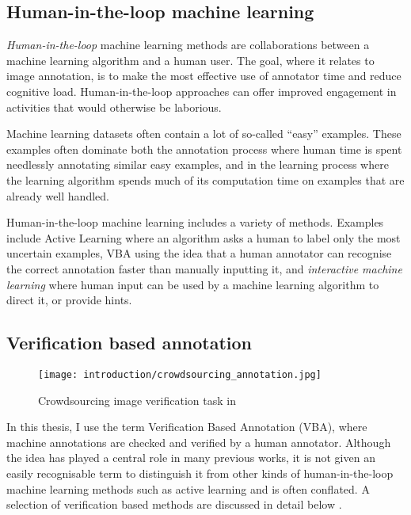 \subsection{Human-in-the-loop machine learning}

\emph{Human-in-the-loop} machine learning methods are collaborations between a machine learning algorithm and a human user. The goal, where it relates to image annotation, is to make the most effective use of annotator time and reduce cognitive load. Human-in-the-loop approaches can offer improved engagement in activities that would otherwise be laborious.

Machine learning datasets often contain a lot of so-called ``easy'' examples. These examples often dominate both the annotation process where human time is spent needlessly annotating similar easy examples, and in the learning process where the learning algorithm spends much of its computation time on examples that are already well handled. 

Human-in-the-loop machine learning includes a variety of methods. Examples include Active Learning where an algorithm asks a human to label only the most uncertain examples, \gls{VBA} using the idea that a human annotator can recognise the correct annotation faster than manually inputting it, and \emph{interactive machine learning} where human input can be used by a machine learning algorithm to direct it, or provide hints. 

\subsection{Verification based annotation}

\begin{figure}[h]
  \centering
  \texttt{[image: introduction/crowdsourcing\_annotation.jpg]}
  \caption{Crowdsourcing image verification task in \cite{Su2012a}} 
  \label{fig:crowdsourcing}
\end{figure}

In this thesis, I use the term Verification Based Annotation (VBA), where machine annotations are checked and verified by a human annotator. Although the idea has played a central role in many previous works, it is not given an easily recognisable term to distinguish it from other kinds of human-in-the-loop machine learning methods such as active learning and is often conflated. A selection of verification based methods are discussed in detail below \cite{Yao2012, McNeill2011, Adhikaria2018, Castrejon2017, Papadopoulos2016, Russakovsky2015a}. 

